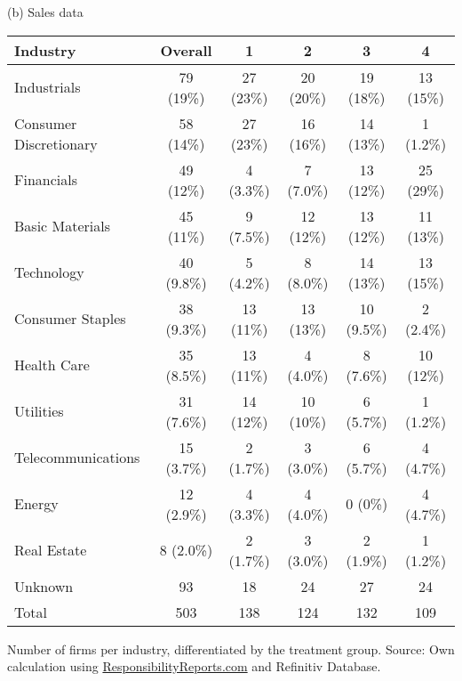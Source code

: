 \documentclass[12pt]{article}
\begin{document}
\begin{table}
    \vspace{1cm}
    (b) Sales data
    \vspace{0.5cm}

    \begin{tabular}{lccccc}
        \toprule
        Industry & Overall & 1 & 2 & 3 & 4 \\
        \midrule
        Industrials & 79 (19\%) & 27 (23\%) & 20 (20\%) & 19 (18\%) & 13 (15\%)\\
        Consumer Discretionary & 58 (14\%) & 27 (23\%) & 16 (16\%) & 14 (13\%) & 1 (1.2\%)\\
        Financials & 49 (12\%) & 4 (3.3\%) & 7 (7.0\%) & 13 (12\%) & 25 (29\%)\\
        Basic Materials & 45 (11\%) & 9 (7.5\%) & 12 (12\%) & 13 (12\%) & 11 (13\%)\\
        Technology & 40 (9.8\%) & 5 (4.2\%) & 8 (8.0\%) & 14 (13\%) & 13 (15\%)\\
        Consumer Staples & 38 (9.3\%) & 13 (11\%) & 13 (13\%) & 10 (9.5\%) & 2 (2.4\%)\\
        Health Care & 35 (8.5\%) & 13 (11\%) & 4 (4.0\%) & 8 (7.6\%) & 10 (12\%)\\
        Utilities & 31 (7.6\%) & 14 (12\%) & 10 (10\%) & 6 (5.7\%) & 1 (1.2\%)\\
        Telecommunications & 15 (3.7\%) & 2 (1.7\%) & 3 (3.0\%) & 6 (5.7\%) & 4 (4.7\%)\\
        Energy & 12 (2.9\%) & 4 (3.3\%) & 4 (4.0\%) & 0 (0\%) & 4 (4.7\%)\\
        Real Estate & 8 (2.0\%) & 2 (1.7\%) & 3 (3.0\%) & 2 (1.9\%) & 1 (1.2\%)\\
        Unknown & 93 & 18 & 24 & 27 & 24\\
        \midrule
        Total & 503 & 138 & 124 & 132 & 109 \\
        \bottomrule
    \end{tabular}

    \vspace{0.2cm}

    \begin{tablenotes}
        \footnotesize
        \item Number of firms per industry, differentiated by the treatment group. Source: Own calculation using \href{https://responsibilityreports.com}{ResponsibilityReports.com} and Refinitiv Database.
    \end{tablenotes}

\end{table}
\end{document}
